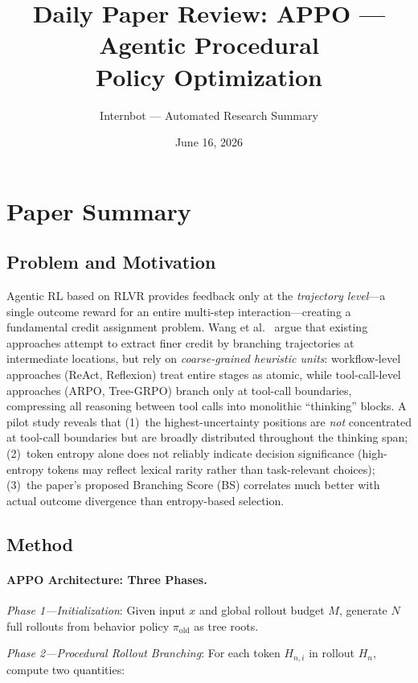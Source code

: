 \documentclass[11pt,a4paper]{article}
\title{Daily Paper Review: APPO --- Agentic Procedural\\Policy Optimization}
\author{Internbot --- Automated Research Summary}
\date{June 16, 2026}
\begin{document}
\maketitle

\section{Paper Summary}

\subsection{Problem and Motivation}

Agentic RL based on RLVR provides feedback only at the \emph{trajectory level}---a single outcome reward for an entire multi-step interaction---creating a fundamental credit assignment problem. Wang et al.~\cite{wang2026appo} argue that existing approaches attempt to extract finer credit by branching trajectories at intermediate locations, but rely on \emph{coarse-grained heuristic units}: workflow-level approaches (ReAct, Reflexion) treat entire stages as atomic, while tool-call-level approaches (ARPO, Tree-GRPO) branch only at tool-call boundaries, compressing all reasoning between tool calls into monolithic ``thinking'' blocks. A pilot study reveals that (1)~the highest-uncertainty positions are \emph{not} concentrated at tool-call boundaries but are broadly distributed throughout the thinking span; (2)~token entropy alone does not reliably indicate decision significance (high-entropy tokens may reflect lexical rarity rather than task-relevant choices); (3)~the paper's proposed Branching Score (BS) correlates much better with actual outcome divergence than entropy-based selection.

\subsection{Method}

\paragraph{APPO Architecture: Three Phases.}

\emph{Phase 1---Initialization}: Given input $x$ and global rollout budget $M$, generate $N$ full rollouts from behavior policy $\pi_{\mathrm{old}}$ as tree roots.

\emph{Phase 2---Procedural Rollout Branching}: For each token $H_{n,i}$ in rollout $H_n$, compute two quantities:
\end{document}
